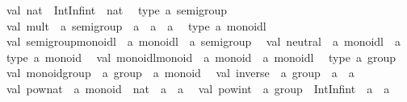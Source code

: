 \begin{isabellebody}
\begin{isamarkuptext}
\ \ val\ nat\ {}\ IntInf{}int\ {}{}\ nat\isanewline
\ \ type\ {}a\ semigroup\isanewline
\ \ val\ mult\ {}\ {}a\ semigroup\ {}{}\ {}a\ {}{}\ {}a\ {}{}\ {}a\isanewline
\ \ type\ {}a\ monoidl\isanewline
\ \ val\ semigroup{}monoidl\ {}\ {}a\ monoidl\ {}{}\ {}a\ semigroup\isanewline
\ \ val\ neutral\ {}\ {}a\ monoidl\ {}{}\ {}a\isanewline
\ \ type\ {}a\ monoid\isanewline
\ \ val\ monoidl{}monoid\ {}\ {}a\ monoid\ {}{}\ {}a\ monoidl\isanewline
\ \ type\ {}a\ group\isanewline
\ \ val\ monoid{}group\ {}\ {}a\ group\ {}{}\ {}a\ monoid\isanewline
\ \ val\ inverse\ {}\ {}a\ group\ {}{}\ {}a\ {}{}\ {}a\isanewline
\ \ val\ pow{}nat\ {}\ {}a\ monoid\ {}{}\ nat\ {}{}\ {}a\ {}{}\ {}a\isanewline
\ \ val\ pow{}int\ {}\ {}a\ group\ {}{}\ IntInf{}int\ {}{}\ {}a\ {}{}\ {}a\isanewline

\end{isamarkuptext}
\end{isabellebody}
